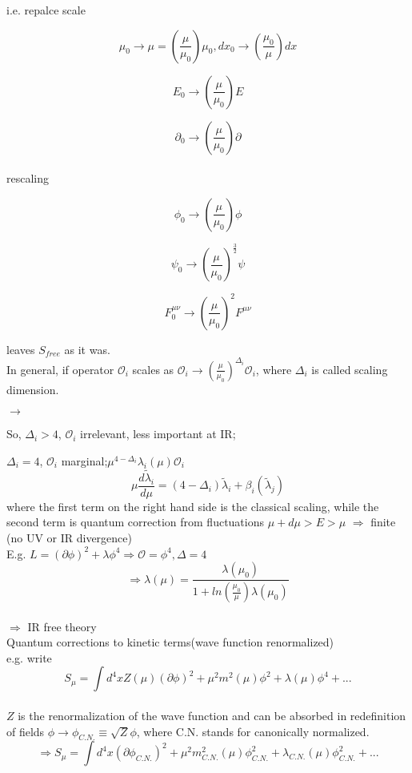 \documentclass[type = bachelor]{fduthesis-en}
\begin{document}
i.e. repalce scale

$$\mu_{0} \rightarrow \mu = (\frac{\mu}{\mu_{0}})\mu_{0}, dx_0 \rightarrow (\frac{\mu_0}{\mu})dx$$

$$E_0 \rightarrow (\frac{\mu}{\mu_0})E$$

$$\partial_0 \rightarrow (\frac{\mu}{\mu_0})\partial$$
\bigskip\\
rescaling

$$\phi_0 \rightarrow (\frac{\mu}{\mu_0})\phi$$

$$\psi_0 \rightarrow (\frac{\mu}{\mu_0})^{\frac{3}{2}}\psi$$

$$F^{\mu\nu}_0 \rightarrow (\frac{\mu}{\mu_0})^2F^{\mu\nu}$$

leaves $S_{free}$ as it was.
\bigskip\\
In general, if operator $\mathcal{O}_i$ scales as $\mathcal{O}_i \rightarrow (\frac{\mu}{\mu_0})^{\Delta_i}\mathcal{O}_i$, where $\Delta_i$ is called scaling dimension.

$\rightarrow$

\noindent So, $\Delta_i > 4$, $\mathcal{O}_i$ irrelevant, less important at IR;

$\Delta_i = 4$, $\mathcal{O}_i$ marginal;$\mu^{4-\Delta_i}\lambda_i(\mu)\mathcal{O}_i$\\
$$\mu\frac{d\tilde{\lambda}_i}{d\mu}=(4-\Delta_i)\tilde{\lambda}_i+\beta_i(\tilde{\lambda}_j)$$
where the first term on the right hand side is the classical scaling, while the second term is quantum correction from fluctuations $\mu +d\mu>E>\mu$ $\Rightarrow$ finite (no UV or IR divergence)
\\E.g. $L=(\partial\phi)^2+\lambda\phi^4 \Rightarrow \mathcal{O}=\phi^4, \Delta = 4$
\\$$\Rightarrow \lambda(\mu)=\frac{\lambda(\mu_0)}{1+ln(\frac{\mu_0}{\mu})\lambda(\mu_0)}$$
\\$\Rightarrow$ IR free theory\\
\bigskip Quantum corrections to kinetic terms(wave function renormalized)
\\e.g. write $$S_{\mu}=\int d^4x{Z(\mu)(\partial\phi)^2+\mu^2m^2(\mu)\phi^2+\lambda(\mu)\phi^4+...}$$\\
$Z$ is the renormalization of the wave function and can be absorbed in redefinition of fields $\phi \rightarrow \phi_{C.N.}\equiv \sqrt{Z}\phi$, where C.N. stands for canonically normalized.
$$\Rightarrow S_{\mu}=\int d^4x{(\partial\phi_{C.N.})^2+\mu^2m_{C.N.}^2(\mu)\phi_{C.N.}^2+\lambda_{C.N.}(\mu)\phi_{C.N.}^2+...}$$
\end{document}

